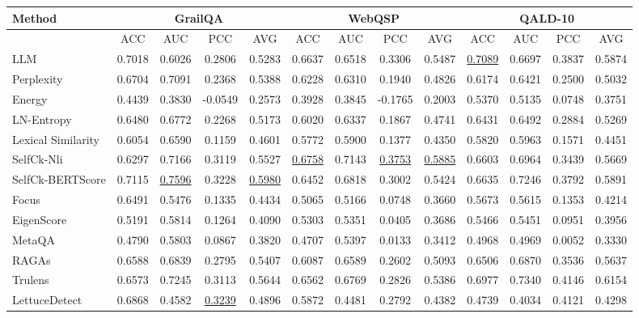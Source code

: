 \documentclass[11pt]{article}
\begin{document}
\begin{table}[t]
\centering
\fontsize{8.6pt}{10pt}\selectfont
\setlength{\tabcolsep}{2pt}   
{
\renewcommand{\arraystretch}{1.3}
\begin{tabular}{l | c c c c | c c c c | c c c c}
\hline
\textbf{Method} & \multicolumn{4}{c}{\textbf{GrailQA}} & \multicolumn{4}{c}{\textbf{WebQSP}} & \multicolumn{4}{c}{\textbf{QALD-10}} \\
\hline
 & ACC & AUC & PCC & AVG & ACC & AUC & PCC & AVG & ACC & AUC & PCC & AVG \\
\hline
LLM & 0.7018 & 0.6026 & 0.2806 & 0.5283 & 0.6637 & 0.6518 & 0.3306 & 0.5487 & \underline{0.7089} & 0.6697 & 0.3837 & 0.5874 \\
Perplexity & 0.6704 & 0.7091 & 0.2368 & 0.5388 & 0.6228 & 0.6310 & 0.1940 & 0.4826 & 0.6174 & 0.6421 & 0.2500 & 0.5032 \\
Energy & 0.4439 & 0.3830 & -0.0549 & 0.2573 & 0.3928 & 0.3845 & -0.1765 & 0.2003 & 0.5370 & 0.5135 & 0.0748 & 0.3751 \\
LN-Entropy & 0.6480 & 0.6772 & 0.2268 & 0.5173 & 0.6020 & 0.6337 & 0.1867 & 0.4741 & 0.6431 & 0.6492 & 0.2884 & 0.5269 \\
Lexical Similarity & 0.6054 & 0.6590 & 0.1159 & 0.4601 & 0.5772 & 0.5900 & 0.1377 & 0.4350 & 0.5820 & 0.5963 & 0.1571 & 0.4451 \\
SelfCk-Nli & 0.6297 & 0.7166 & 0.3119 & 0.5527 & \underline{0.6758} & 0.7143 & \underline{0.3753} & \underline{0.5885} & 0.6603 & 0.6964 & 0.3439 & 0.5669 \\
SelfCk-BERTScore & 0.7115 & \underline{0.7596} & 0.3228 & \underline{0.5980} & 0.6452 & 0.6818 & 0.3002 & 0.5424 & 0.6635 & 0.7246 & 0.3792 & 0.5891 \\
Focus & 0.6491 & 0.5476 & 0.1335 & 0.4434 & 0.5065 & 0.5166 & 0.0748 & 0.3660 & 0.5673 & 0.5615 & 0.1353 & 0.4214 \\
EigenScore & 0.5191 & 0.5814 & 0.1264 & 0.4090 & 0.5303 & 0.5351 & 0.0405 & 0.3686 & 0.5466 & 0.5451 & 0.0951 & 0.3956 \\
MetaQA & 0.4790 & 0.5803 & 0.0867 & 0.3820 & 0.4707 & 0.5397 & 0.0133 & 0.3412 & 0.4968 & 0.4969 & 0.0052 & 0.3330 \\
\hline
RAGAs & 0.6588 & 0.6839 & 0.2795 & 0.5407 & 0.6087 & 0.6589 & 0.2602 & 0.5093 & 0.6506 & 0.6870 & 0.3536 & 0.5637 \\
Trulens & 0.6573 & 0.7245 & 0.3113 & 0.5644 & 0.6562 & 0.6769 & 0.2826 & 0.5386 & 0.6977 & 0.7340 & 0.4146 & 0.6154 \\
LettuceDetect & 0.6868 & 0.4582 & \underline{0.3239} & 0.4896 & 0.5872 & 0.4481 & 0.2792 & 0.4382 & 0.4739 & 0.4034 & 0.4121 & 0.4298 \\

\end{tabular}}
\end{table}
\end{document}
